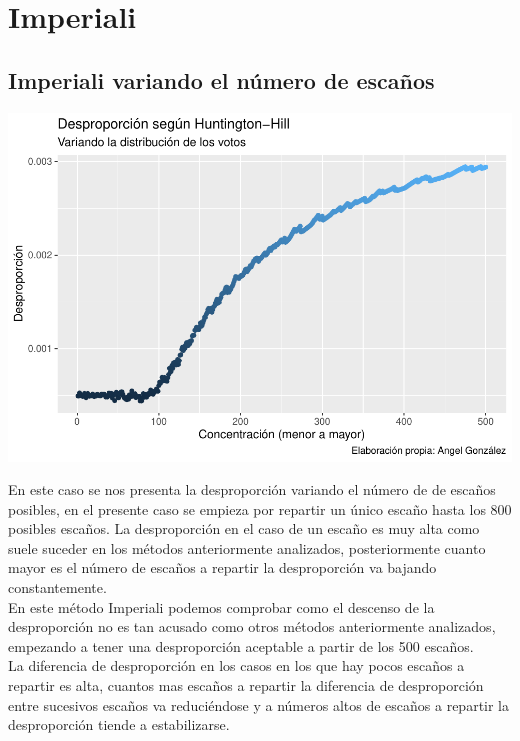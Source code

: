 \documentclass[12pt,a4paper,]{book}
\numberwithin{dummy}{section}
\theoremstyle{ocrenumbox}
\theoremstyle{blacknumex}
\theoremstyle{blacknumbox}
\theoremstyle{ocrenum}
\theoremstyle{ocrenum}
\begin{document}
\hypertarget{imperiali}{%
\section{Imperiali}\label{imperiali}}

\hypertarget{imperiali-variando-el-nuxfamero-de-escauxf1os}{%
\subsection{Imperiali variando el número de
escaños}\label{imperiali-variando-el-nuxfamero-de-escauxf1os}}

\begin{center}\includegraphics[width=0.95\linewidth]{figurasR/unnamed-chunk-28-1} \end{center}

En este caso se nos presenta la desproporción variando el número de de
escaños posibles, en el presente caso se empieza por repartir un único
escaño hasta los 800 posibles escaños. La desproporción en el caso de un
escaño es muy alta como suele suceder en los métodos anteriormente
analizados, posteriormente cuanto mayor es el número de escaños a
repartir la desproporción va bajando constantemente.\\
En este método Imperiali podemos comprobar como el descenso de la
desproporción no es tan acusado como otros métodos anteriormente
analizados, empezando a tener una desproporción aceptable a partir de
los 500 escaños.\\
La diferencia de desproporción en los casos en los que hay pocos escaños
a repartir es alta, cuantos mas escaños a repartir la diferencia de
desproporción entre sucesivos escaños va reduciéndose y a números altos
de escaños a repartir la desproporción tiende a estabilizarse.
\end{document}
